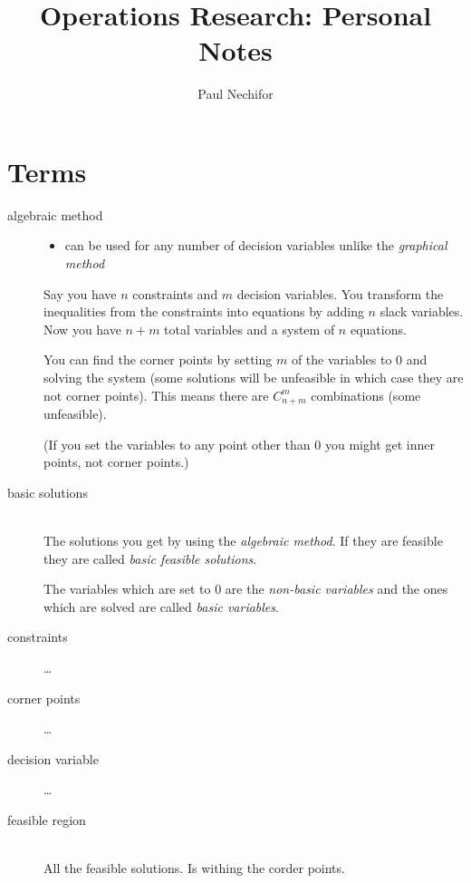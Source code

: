 \documentclass[a4paper, 12pt]{article}
\title{Operations Research: Personal Notes}
\author{Paul Nechifor}
\begin{document}
\maketitle

\section{Terms}

\begin{description}

\item[algebraic method] \hfill
    \begin{itemize}
    \item can be used for any number of decision variables unlike the
        \emph{graphical method}
    \end{itemize}
    
    Say you have $n$ constraints and $m$ decision variables. You transform the
    inequalities from the constraints into equations by adding $n$ slack
    variables. Now you have $n+m$ total variables and a system of $n$ equations.
    
    You can find the corner points by setting $m$ of the variables to 0 and
    solving the system (some solutions will be unfeasible in which case they are
    not corner points). This means there are $C_{n+m}^m$ combinations (some
    unfeasible).
    
    (If you set the variables to any point other than 0 you
    might get inner points, not corner points.)

\item[basic solutions] \hfill \\
    The solutions you get by using the \emph{algebraic method}. If they are
    feasible they are called \emph{basic feasible solutions}.
    
    The variables which are set to 0 are the \emph{non-basic variables} and the
    ones which are solved are called \emph{basic variables}.

\item[constraints] \ldots

\item[corner points] \ldots

\item[decision variable] \ldots

\item[feasible region] \hfill \\
    All the feasible solutions. Is withing the corder points.


\end{description}
\end{document}
